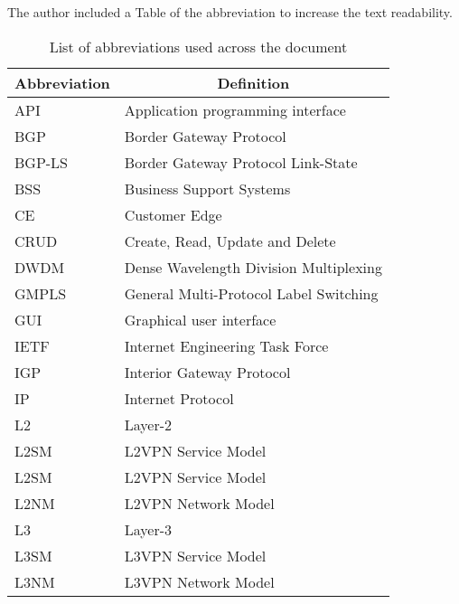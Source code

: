 \documentclass[12pt]{journalrebuttal}
\begin{document}
\begin{response}

The author included a Table of the abbreviation to increase the text readability.  

\begin{table}[htb!]
\caption{List of abbreviations used across the document}
\label{tab:abbreviations}
\begin{tabular}{|l|l|}
\hline
Abbreviation & \multicolumn{1}{c|}{Definition}              \\ \hline
API          & Application programming interface            \\ \hline
BGP          & Border Gateway Protocol                      \\ \hline
BGP-LS       & Border Gateway Protocol Link-State            \\ \hline
BSS          & Business Support Systems                     \\ \hline
CE           & Customer Edge                                \\ \hline
CRUD         & Create, Read, Update and Delete              \\ \hline
DWDM         & Dense Wavelength Division Multiplexing       \\ \hline
GMPLS        & General Multi-Protocol Label Switching       \\ \hline
GUI          & Graphical user interface                     \\ \hline
IETF         & Internet Engineering Task Force              \\ \hline
IGP          & Interior Gateway Protocol                    \\ \hline
IP           & Internet Protocol                            \\ \hline
L2           & Layer-2                                      \\ \hline
L2SM         & L2VPN Service Model                          \\ \hline
L2SM         & L2VPN Service Model                          \\ \hline
L2NM         & L2VPN Network Model                          \\ \hline
L3           & Layer-3                                      \\ \hline
L3SM         & L3VPN Service Model                          \\ \hline
L3NM         & L3VPN Network Model                          \\ \hline

\end{tabular}
\end{table}
\end{response}
\end{document}

